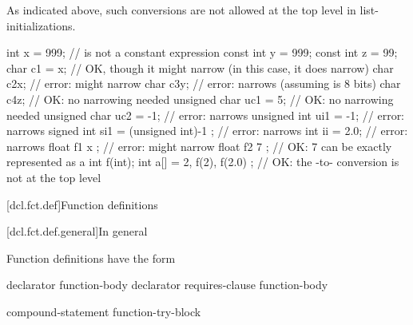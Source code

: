 \begin{note} As indicated above, such conversions are not allowed at the top level in
list-initializations.\end{note} \begin{example}

\begin{codeblock}
int x = 999;                    //  is not a constant expression
const int y = 999;
const int z = 99;
char c1 = x;                    // OK, though it might narrow (in this case, it does narrow)
char c2{x};                     // error: might narrow
char c3{y};                     // error: narrows (assuming  is 8 bits)
char c4{z};                     // OK: no narrowing needed
unsigned char uc1 = {5};        // OK: no narrowing needed
unsigned char uc2 = {-1};       // error: narrows
unsigned int ui1 = {-1};        // error: narrows
signed int si1 =
  { (unsigned int)-1 };         // error: narrows
int ii = {2.0};                 // error: narrows
float f1 { x };                 // error: might narrow
float f2 { 7 };                 // OK: 7 can be exactly represented as a 
int f(int);
int a[] = { 2, f(2), f(2.0) };  // OK: the -to- conversion is not at the top level
\end{codeblock}
\end{example}%
%
%

[dcl.fct.def]{Function definitions}%

[dcl.fct.def.general]{In general}

\pnum
{}%
Function definitions have the form

%
%
\begin{bnf}
\br
      declarator  function-body\br
      declarator requires-clause function-body
\end{bnf}

\begin{bnf}
\br
     compound-statement\br
    function-try-block\br
    \terminal{=}  \terminal{;}\br
    \terminal{=}  \terminal{;}
\end{bnf}

